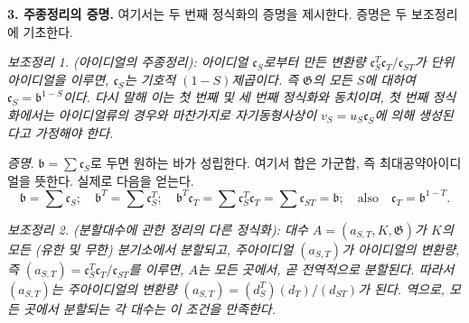 
\noindent\textbf{3. 주종정리의 증명.} 여기서는 두 번째 정식화의 증명을 제시한다. 증명은 두 보조정리에 기초한다.

\emph{보조정리 1. (아이디얼의 주종정리): 아이디얼 \(\mathfrak c_S\)로부터 만든 변환량 \(\mathfrak c_S^T\mathfrak c_T/\mathfrak c_{ST}\)가 단위아이디얼을 이루면, \(\mathfrak c_S\)는 기호적 \((1-S)\)제곱이다. 즉 \(\mathfrak G\)의 모든 \(S\)에 대하여 \(\mathfrak c_S=\mathfrak b^{1-S}\)이다. 다시 말해 이는 첫 번째 및 세 번째 정식화와 동치이며, 첫 번째 정식화에서는 아이디얼류의 경우와 마찬가지로 자기동형사상이 \(v_S=u_S\mathfrak c_S\)에 의해 생성된다고 가정해야 한다.}

\emph{증명}. \(\mathfrak b=\sum\mathfrak c_S\)로 두면 원하는 바가 성립한다. 여기서 합은 가군합, 즉 최대공약아이디얼을 뜻한다. 실제로 다음을 얻는다.
\[
\mathfrak b=\sum\mathfrak c_S;\quad
\mathfrak b^T=\sum\mathfrak c_S^T;\quad
\mathfrak b^T\mathfrak c_T=\sum\mathfrak c_S^T\mathfrak c_T
=\sum\mathfrak c_{ST}=\mathfrak b;\quad
\text{also}\quad\mathfrak c_T=\mathfrak b^{1-T}.
\]

\emph{보조정리 2. (분할대수에 관한 정리의 다른 정식화): 대수 \(A=(a_{S,T},K,\mathfrak G)\)가 \(K\)의 모든 (유한 및 무한) 분기소에서 분할되고, 주아이디얼 \((a_{S,T})\)가 아이디얼의 변환량, 즉 \((a_{S,T})=\mathfrak c_S^T\mathfrak c_T/\mathfrak c_{ST}\)를 이루면, \(A\)는 모든 곳에서, 곧 전역적으로 분할된다. 따라서 \((a_{S,T})\)는 주아이디얼의 변환량 \((a_{S,T})=(d_S^T)(d_T)/(d_{ST})\)가 된다. 역으로, 모든 곳에서 분할되는 각 대수는 이 조건을 만족한다.}

